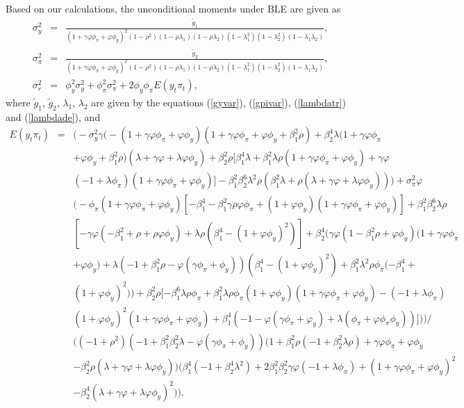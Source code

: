 Based on our calculations, the unconditional moments under BLE are given as 
\begin{eqnarray}
\sigma_y^2&=&\frac{\widetilde{g}_1}{(1+\gamma\varphi\phi_\pi+\varphi\phi_y)^2(1-\rho^2)(1-\rho\lambda_1)(1-\rho\lambda_2)(1-\lambda_1^2)(1-\lambda_2^2)(1-\lambda_1\lambda_2)}, \label{varyc}\\
\sigma_\pi^2&=&\frac{\widetilde{g}_2}{(1+\gamma\varphi\phi_\pi+\varphi\phi_y)^2(1-\rho^2)(1-\rho\lambda_1)(1-\rho\lambda_2)(1-\lambda_1^2)(1-\lambda_2^2)(1-\lambda_1\lambda_2)}, \label{varpic}\\
\sigma_r^2&=&\phi_y^2\sigma_y^2+\phi_\pi^2\sigma_\pi^2+2\phi_y\phi_\pi E(y_t\pi_t),\label{varrc}
\end{eqnarray}
where $\widetilde{g}_1$, $\widetilde{g}_2$, $\lambda_1$, $\lambda_2$ are given by the equations (\ref{gyvar}), (\ref{gpivar}), (\ref{lambdatr}) and (\ref{lambdade}), and
\begin{eqnarray*}
E(y_t\pi_t)&=&\Big(-\sigma_y^2\gamma\big(-(1+\gamma\varphi\phi_\pi+\varphi\phi_y)(1+\gamma\varphi\phi_\pi+\varphi\phi_y+\beta_1^2\rho)+\beta_2^4\lambda(1+\gamma\varphi\phi_\pi\\
&&+\varphi\phi_y+\beta_1^2\rho)(\lambda+\gamma\varphi+\lambda\varphi\phi_y)+\beta_2^2\rho[\beta_1^4\lambda+\beta_1^2\lambda\rho(1+\gamma\varphi\phi_\pi+\varphi\phi_y)+\gamma\varphi\\
&&(-1+\lambda \phi_\pi)(1+\gamma\varphi\phi_\pi+\varphi\phi_y)]-\beta_1^2\beta_2^6\lambda^2\rho(\beta_1^2\lambda+\rho(\lambda+\gamma\varphi+\lambda\varphi\phi_y))\big)+\sigma_{\pi}^2\varphi\\
&&\big(-\phi_\pi(1+\gamma\varphi\phi_\pi+\varphi\phi_y)[-\beta_1^4-\beta_1^2\gamma\rho\varphi\phi_\pi+(1+\varphi\phi_y)(1+\gamma\varphi\phi_\pi+\varphi\phi_y)]+\beta_1^2\beta_2^6\lambda\rho\\
&&[-\gamma\varphi(-\beta_1^2+\rho+\rho\varphi\phi_y)+\lambda\rho(\beta_1^4-(1+\varphi\phi_y)^2)]+\beta_2^4\big(\gamma\varphi(1-\beta_1^2\rho+\varphi\phi_y)(1+\gamma\varphi\phi_\pi\\
&&+\varphi\phi_y)+\lambda(-1+\beta_1^2\rho-\varphi(\gamma\phi_\pi+\phi_y))(\beta_1^4-(1+\varphi\phi_y)^2)+\beta_1^2\lambda^2\rho\phi_\pi(-\beta_1^4+\\
&&(1+\varphi\phi_y)^2)\big)+\beta_2^2\rho[-\beta_1^6\lambda\rho\phi_\pi+\beta_1^2\lambda\rho\phi_\pi(1+\varphi\phi_y)(1+\gamma\varphi\phi_\pi+\varphi\phi_y)-(-1+\lambda\phi_\pi)\\
&&(1+\varphi\phi_y)^2(1+\gamma\varphi\phi_\pi+\varphi\phi_y)+\beta_1^4(-1-\varphi(\gamma\phi_\pi+\varphi_y)+\lambda(\phi_\pi+\varphi\phi_\pi\phi_y))]\big)\Big)\Big/  \\
&& \Big((-1+\rho^2)(-1+\beta_1^2\beta_2^2\lambda-\varphi(\gamma\phi_\pi+\phi_y))(1+\beta_1^2\rho(-1+\beta_2^2\lambda\rho)+\gamma\varphi\phi_\pi+\varphi\phi_y\\
&&-\beta_2^2\rho(\lambda+\gamma\varphi+\lambda\varphi\phi_y))\big(\beta_1^4(-1+\beta_2^4\lambda^2)+2\beta_1^2\beta_2^2\gamma\varphi(-1+\lambda\phi_\pi)+(1+\gamma\varphi\phi_\pi+\varphi\phi_y)^2\\
&&-\beta_2^4(\lambda+\gamma\varphi+\lambda\varphi\phi_y)^2\big)\Big).
\end{eqnarray*}
